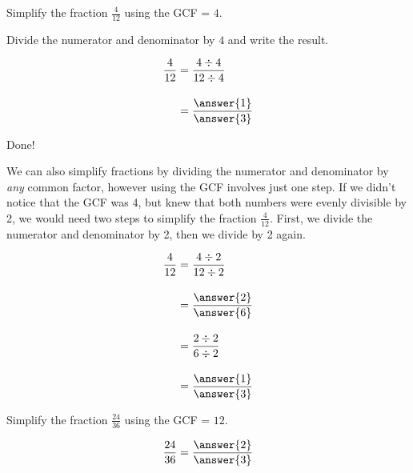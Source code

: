 \documentclass{ximera}[font=12pt]  %
\begin{document}
\begin{example}

Simplify the fraction $\displaystyle \frac{4}{12}$ using the GCF = $4.$

\begin{explanation}

Divide the numerator and denominator by $4$ and write the result. 

\begin{align*}
\frac{4}{12} &= \frac{4 \div 4}{12 \div 4} \\[1em]
             &= \frac{\answer{1}}{\answer{3}}
\end{align*}

Done!

We can also simplify fractions by dividing the numerator and denominator by \emph{any} common factor, however using the GCF involves just one step.
If we didn't notice that the GCF was 4, but knew that both numbers were evenly divisible by 2, we would need two steps to simplify 
the fraction $\textstyle \frac{4}{12}.$  First, we divide the numerator and denominator by 2, then we divide by 2 again.  


\begin{align*}
\frac{4}{12} &= \frac{4 \div 2}{12 \div 2} \\[1em]
             &= \frac{\answer{2}}{\answer{6}}             \\[1em]
             &= \frac{2 \div 2}{6 \div 2} \\[1em]
             &= \frac{\answer{1}}{\answer{3}}
\end{align*}


\end{explanation}
\end{example}


\begin{problem}
  Simplify the fraction $\displaystyle \frac{24}{36}$ using the GCF = $12.$

  \[
  \frac{24}{36} = \frac{\answer{2}}{\answer{3}}
  \]

\end{problem}
\end{document}
